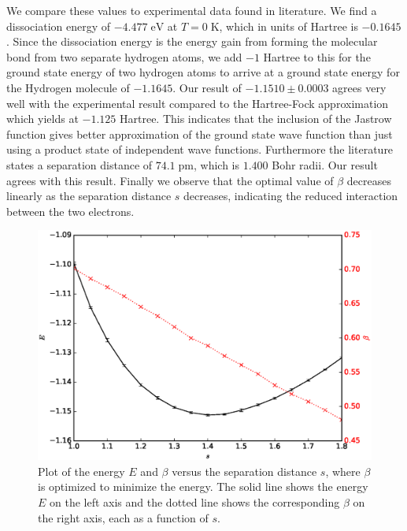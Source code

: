 \documentclass[twoside]{article}
\newcommand{\unit}[1]{\ensuremath{\; \mathrm{#1}}}
\begin{document}
We compare these values to experimental data found in literature\cite{ref_NIST}\cite{ref_Grinter}. We find a dissociation energy of $-4.477 \unit{eV}$ at $T=0 \unit{K}$, which in units of Hartree is $-0.1645$. Since the dissociation energy is the energy gain from forming the molecular bond from two separate hydrogen atoms, we add $-1$ Hartree to this for the ground state energy of two hydrogen atoms to arrive at a ground state energy for the Hydrogen molecule of $-1.1645$. Our result of $-1.1510 \pm 0.0003$ agrees very well with the experimental result compared to the Hartree-Fock approximation which yields at $-1.125$ Hartree. This indicates that the inclusion of the Jastrow function gives better approximation of the ground state wave function than just using a product state of independent wave functions. Furthermore the literature states a separation distance of $74.1 \unit{pm}$, which is $1.400$ Bohr radii. Our result agrees with this result. Finally we observe that the optimal value of $\beta$ decreases linearly as the separation distance $s$ decreases, indicating the reduced interaction between the two electrons.

\begin{figure}[h]
	\centering
	\includegraphics[width=0.8\linewidth]{figs/EvsS_optimalBeta.eps}
	\caption{Plot of the energy $E$ and $\beta$ versus the separation distance $s$, where $\beta$ is optimized to minimize the energy. The solid line shows the energy $E$ on the left axis and the dotted line shows the corresponding $\beta$ on the right axis, each as a function of $s$.}
	\label{fig:EvsS_optimalBeta}
\end{figure}
\end{document}
